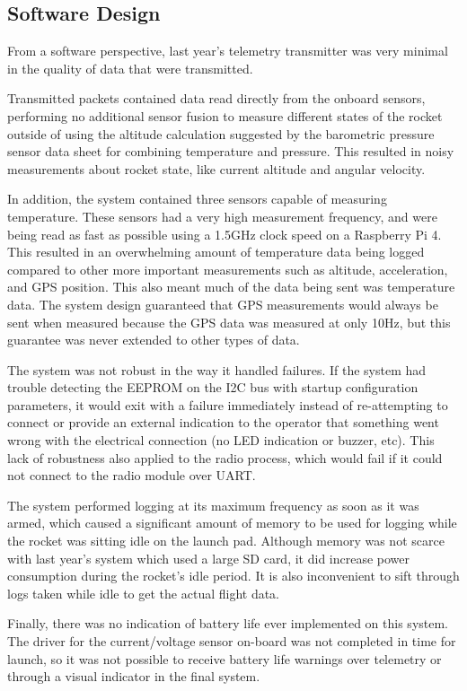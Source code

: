 \subsection{Software Design}

From a software perspective, last year's telemetry transmitter was very minimal in the quality of data that were
transmitted.

Transmitted packets contained data read directly from the onboard sensors, performing no additional sensor fusion to measure different states of the rocket outside of using the altitude calculation suggested by the barometric pressure sensor data sheet for combining temperature and pressure. This resulted in noisy measurements about rocket state, like current altitude and angular velocity.

In addition, the system contained three sensors capable of measuring temperature. These sensors had a very high measurement frequency, and were being read as fast as possible using a 1.5GHz clock speed on a Raspberry Pi 4. This resulted in an overwhelming amount of temperature data being logged compared to other more important measurements such as altitude, acceleration, and GPS position. This also meant much of the data being sent was temperature data. The system design guaranteed that GPS measurements would always be sent when measured because the GPS data was measured at only 10Hz, but this guarantee was never extended to other types of data.

The system was not robust in the way it handled failures. If the system had trouble detecting the EEPROM on the I2C bus with startup configuration parameters, it would exit with a failure immediately instead of re-attempting to connect or provide an external indication to the operator that something went wrong with the electrical connection (no LED indication or buzzer, etc). This lack of robustness also applied to the radio process, which would fail if it could not connect to the radio module over UART.

The system performed logging at its maximum frequency as soon as it was armed, which caused a significant amount of memory to be used for logging while the rocket was sitting idle on the launch pad. Although memory was not scarce with last year's system which used a large SD card, it did increase power consumption during the rocket's idle period. It is also inconvenient to sift through logs taken while idle to get the actual flight data.

Finally, there was no indication of battery life ever implemented on this system. The driver for the current/voltage sensor on-board was not completed in time for launch, so it was not possible to receive battery life warnings over telemetry or through a visual indicator in the final system.
